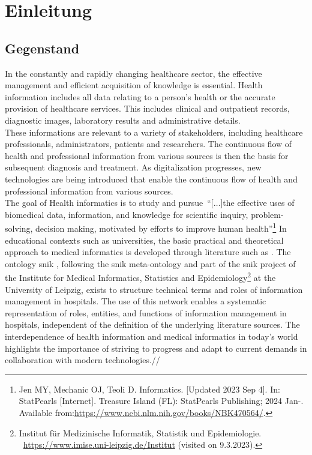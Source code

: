 \chapter{Einleitung}\label{ch:introduction}
\section{Gegenstand}
In the constantly and rapidly changing healthcare sector, the effective management and efficient acquisition of knowledge is essential. 
Health information includes all data relating to a person's health or the accurate provision of healthcare services. This includes clinical and outpatient records, diagnostic images, laboratory results and administrative details.\\

These informations are relevant to a variety of stakeholders, including healthcare professionals, administrators, patients and researchers. 
The continuous flow of health and professional information from various sources is then the basis for subsequent diagnosis and treatment. 
As digitalization progresses, new technologies are being introduced that enable the continuous flow of health and professional information from various sources.\\
 
The goal of Health informatics is to study and pursue~\enquote{[$\dots$]the effective uses of biomedical data, information, and knowledge for scientific inquiry, problem-solving, decision making, motivated by efforts to improve human health}\footnote{\raggedright{}Jen MY, Mechanic OJ, Teoli D. Informatics. [Updated 2023 Sep 4]. In: StatPearls [Internet]. 
Treasure Island (FL): StatPearls Publishing; 2024 Jan-. Available from:\url{https://www.ncbi.nlm.nih.gov/books/NBK470564/}.} 
In educational contexts such as universities, the basic practical and theoretical approach to medical informatics is developed through literature such as \citet{bb}. 
The ontology \ac{snik} \citep{semantischesnetz}, following the \ac{snik} meta-ontology and part of the \ac{snik} project of the Institute for Medical Informatics, Statistics and Epidemiology\footnote{\raggedright{}Institut für Medizinische Informatik, Statistik und Epidemiologie.
\ \url{https://www.imise.uni-leipzig.de/Institut} (visited on 9.3.2023).} at the University of Leipzig, exists to structure technical terms and roles of information management in hospitals. 
The use of this network enables a systematic representation of roles, entities, and functions of information management in hospitals, independent of the definition of the underlying literature sources. 
The interdependence of health information and medical informatics in today's world highlights the importance of striving to progress and adapt to current demands in collaboration with modern technologies.//


